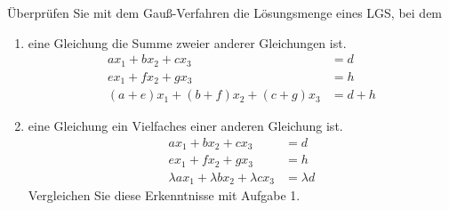 \begin{ExerciseBlock}
Überprüfen Sie mit dem Gauß-Verfahren die Lösungsmenge eines LGS, bei dem

\begin{enumerate}[label=\alph*)]
\item eine Gleichung die Summe zweier anderer Gleichungen ist.
	\begin{equation*}
	\begin{split}
		a x_1 + b x_2 + c x_3 &= d \\
 		e x_1 + f x_2 + g x_3 &= h  \\
 		(a+e) x_1 + (b+f) x_2 + (c+g) x_3 &= d+h
	\end{split}
	\end{equation*}
\item eine Gleichung ein Vielfaches einer anderen Gleichung ist.
	\begin{equation*}
	\begin{split}
		a x_1 + b x_2 + c x_3 &= d \\
 		e x_1 + f x_2 + g x_3 &= h  \\
 		\lambda a x_1 + \lambda b x_2 +  \lambda c x_3 &= \lambda d
	\end{split}
	\end{equation*}
	Vergleichen Sie diese Erkenntnisse mit Aufgabe 1.
\end{enumerate}

\end{ExerciseBlock}

